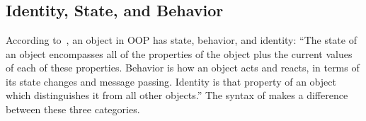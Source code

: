 \begin{figure*}
\begin{multicols}{2}
\begin{tabbing}
  \> \alt {} \V{:}  \\
  \> \alt {}  \\
  \> \alt {}   \\
 \df {} \alt {} \alt {} \alt \V{\$} \\
  \> \alt \V{\^{}} \alt \V{*} \alt {}  \\
 \df {} \alt {} \alt {} \\
  \> \alt {} \alt {} \alt {} \\
 \df {}  \\
 \df \RE{[\textbackslash{}dA-F][\textbackslash{}dA-F]} \\
 \df {} \\
 \df {} \\
 \df {} \\
 \df {} \\
 \df {}  \\
 \df {} \\
\end{tabbing}
\end{multicols}
\label{fig:bnf}
\end{figure*}

\subsection{Identity, State, and Behavior}

According to~\citet{grady2007object}, an object in OOP has state, behavior, and identity:
``The state of an object encompasses all of the properties of
the object plus the current values of each of these properties.
Behavior is how an object acts and reacts, in terms of its state changes and message passing.
Identity is that property of an object which distinguishes it from all other objects.''
The syntax of \eo{} makes a difference between these three categories.

